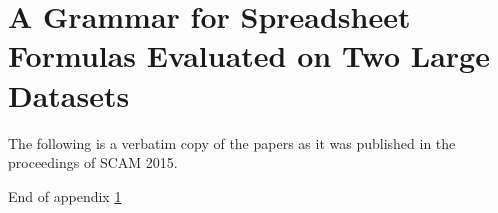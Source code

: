 \documentclass[12pt,a4paper,onecolumn,oneside,parskip]{memoir}
\begin{document}
\chapter{A Grammar for Spreadsheet Formulas Evaluated on Two Large Datasets}
\label{appendix:xlparser}

The following is a verbatim copy of the papers as it was published in the proceedings of SCAM 2015.

\clearpage



\clearpage

\vspace*{\fill}

\centering
\large{End of appendix \ref{appendix:xlparser}}

\vspace*{\fill}
\end{document}

